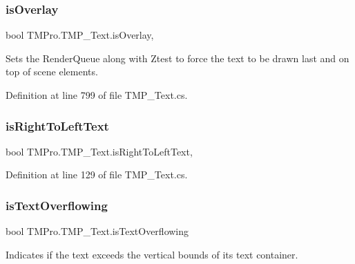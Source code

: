 \subsubsection{\texorpdfstring{isOverlay}{isOverlay}}
{\footnotesize\ttfamily bool T\+M\+Pro.\+T\+M\+P\+\_\+\+Text.\+is\+Overlay\hspace{0.3cm}{\ttfamily [get]}, {\ttfamily [set]}}



Sets the Render\+Queue along with Ztest to force the text to be drawn last and on top of scene elements. 



Definition at line 799 of file T\+M\+P\+\_\+\+Text.\+cs.

\mbox{\label{class_t_m_pro_1_1_t_m_p___text_acd612ae07363999901c0a12d76528215}} 
\subsubsection{\texorpdfstring{isRightToLeftText}{isRightToLeftText}}
{\footnotesize\ttfamily bool T\+M\+Pro.\+T\+M\+P\+\_\+\+Text.\+is\+Right\+To\+Left\+Text\hspace{0.3cm}{\ttfamily [get]}, {\ttfamily [set]}}







Definition at line 129 of file T\+M\+P\+\_\+\+Text.\+cs.

\mbox{\label{class_t_m_pro_1_1_t_m_p___text_ad20ad3119bc80995a2a2ca093b0c1e48}} 
\subsubsection{\texorpdfstring{isTextOverflowing}{isTextOverflowing}}
{\footnotesize\ttfamily bool T\+M\+Pro.\+T\+M\+P\+\_\+\+Text.\+is\+Text\+Overflowing\hspace{0.3cm}{\ttfamily [get]}}



Indicates if the text exceeds the vertical bounds of its text container. 



